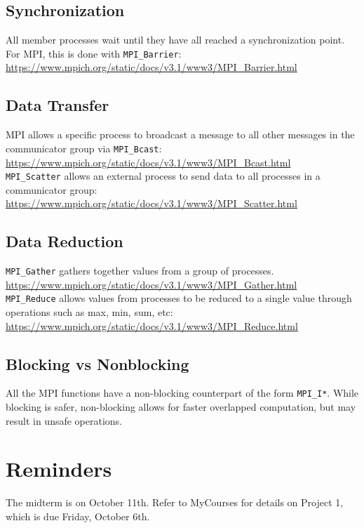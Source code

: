 \documentclass{math}
\begin{document}
\subsection*{Synchronization}
All member processes wait until they have all reached a synchronization point.
For MPI, this is done with \texttt{MPI\_Barrier}: \\
\url{https://www.mpich.org/static/docs/v3.1/www3/MPI_Barrier.html}

\subsection*{Data Transfer}
MPI allows a specific process to broadcast a message to all other messages in
the communicator group via \texttt{MPI\_Bcast}: \\
\url{https://www.mpich.org/static/docs/v3.1/www3/MPI_Bcast.html} \\
\texttt{MPI\_Scatter} allows an external process to send data to all processes
in a communicator group: \\
\url{https://www.mpich.org/static/docs/v3.1/www3/MPI_Scatter.html}

\subsection*{Data Reduction}
\texttt{MPI\_Gather} gathers together values from a group of processes. \\
\url{https://www.mpich.org/static/docs/v3.1/www3/MPI_Gather.html} \\
\texttt{MPI\_Reduce} allows values from processes to be reduced to a single
value through operations such as max, min, sum, etc: \\
\url{https://www.mpich.org/static/docs/v3.1/www3/MPI_Reduce.html}

\subsection*{Blocking vs Nonblocking}
All the MPI functions have a non-blocking counterpart of the form
\texttt{MPI\_I*}. While blocking is safer, non-blocking allows for faster
overlapped computation, but may result in unsafe operations.

\section*{Reminders}
The midterm is on October 11th.
Refer to MyCourses for details on Project 1, which is due Friday,
October 6th. \\
\end{document}
